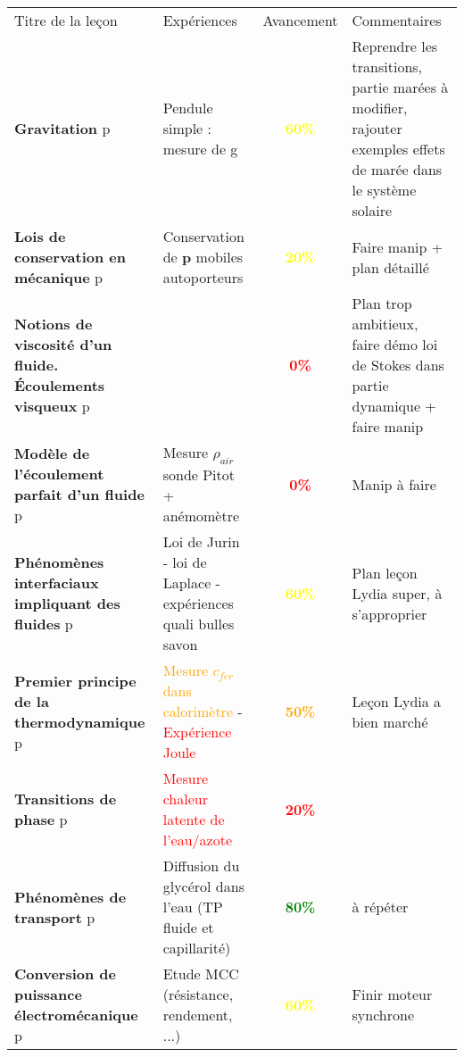 \begin{changemargin}{-1.5cm}{-0cm}

\begin{center}
\begin{tabularx}{\paperwidth-2cm}{| X | X | c | X |}
  \hline
  \rowcolor{gray!20}\multicolumn{4}{c}{Avancement préparation oraux Leçons Physique} \\
  \hline 
  Titre de la leçon & Expériences & Avancement & Commentaires \\
  \hline
\textbf{Gravitation} p\pageref{LP_Gravitation}  & Pendule simple : mesure de g & \textcolor{yellow}{\textbf{60\%}}  & Reprendre les transitions, partie marées à modifier, rajouter exemples effets de marée dans le système solaire   \\
  \hline 
  \hline
     \textbf{Lois de conservation en mécanique} p\pageref{LP_LoisConservation} & Conservation de $\mathbf{p}$ mobiles autoporteurs  &  \textcolor{yellow}{\textbf{20\%}}  & Faire manip + plan détaillé \\
  \hline 
    \textbf{Notions de viscosité d'un fluide. \'{E}coulements visqueux} p\pageref{LP_Viscosite} &  & \textcolor{red}{\textbf{0\%}} & Plan trop ambitieux, faire démo loi de Stokes dans partie dynamique + faire manip \\
  \hline 
  \textbf{Modèle de l'écoulement parfait d'un fluide} p\pageref{LP_EcoulementParfait} & Mesure $\rho_{air}$ sonde Pitot + anémomètre & \textcolor{red}{\textbf{0\%}} & Manip à faire \\
  \hline
  \textbf{Phénomènes interfaciaux impliquant des fluides} p\pageref{LP_PhenomenesInterfaciaux} & Loi de Jurin - loi de Laplace - expériences quali bulles savon & \textcolor{yellow}{\textbf{60\%}} & Plan leçon Lydia super, à s'approprier\\
  \hline 
  \hline
  \textbf{Premier principe de la thermodynamique} p\pageref{LP_PremierPrincipe} & \textcolor{orange}{Mesure $c_{fer}$ dans calorimètre} - \textcolor{red}{Expérience Joule} & \textcolor{orange}{\textbf{50\%}} & Leçon Lydia a bien marché \\
  \hline 
  \textbf{Transitions de phase} p\pageref{LP_TransitionPhase} & \textcolor{red}{Mesure chaleur latente de l'eau/azote} & \textcolor{red}{\textbf{20\%}} & \\
  \hline 
  \textbf{Phénomènes de transport} p\pageref{LP_Transport} & Diffusion du glycérol dans l'eau (TP fluide et capillarité) & \textcolor{green}{\textbf{80\%}} & à répéter\\
  \hline 
  \hline
  \textbf{Conversion de puissance électromécanique} p\pageref{LP_ConversionPuissance} & Etude MCC (résistance, rendement, ...) & \textcolor{yellow}{\textbf{60\%}} & Finir moteur synchrone\\

\end{tabularx}
\end{center}
\end{changemargin}
